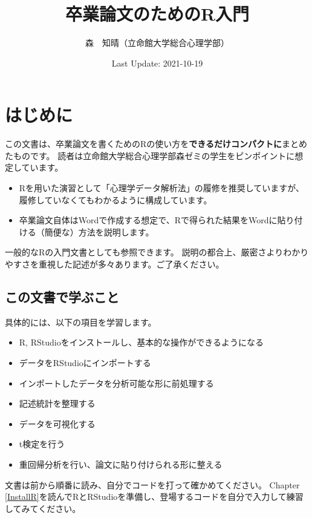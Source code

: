 \documentclass[
]{book}
\title{卒業論文のためのR入門}
\author{森　知晴（立命館大学総合心理学部）}
\date{Last Update: 2021-10-19}
\providecommand{\tightlist}{%
  \setlength{\itemsep}{0pt}\setlength{\parskip}{0pt}}
\begin{document}
\maketitle

{
\setcounter{tocdepth}{1}
\tableofcontents
}
\hypertarget{Introduction}{%
\chapter{はじめに}\label{Introduction}}

この文書は、卒業論文を書くためのRの使い方を\textbf{できるだけコンパクトに}まとめたものです。
読者は立命館大学総合心理学部森ゼミの学生をピンポイントに想定しています。

\begin{itemize}
\tightlist
\item
  Rを用いた演習として「心理学データ解析法」の履修を推奨していますが、履修していなくてもわかるように構成しています。
\item
  卒業論文自体はWordで作成する想定で、Rで得られた結果をWordに貼り付ける（簡便な）方法を説明します。
\end{itemize}

一般的なRの入門文書としても参照できます。
説明の都合上、厳密さよりわかりやすさを重視した記述が多々あります。ご了承ください。

\hypertarget{ux3053ux306eux6587ux66f8ux3067ux5b66ux3076ux3053ux3068}{%
\section{この文書で学ぶこと}\label{ux3053ux306eux6587ux66f8ux3067ux5b66ux3076ux3053ux3068}}

具体的には、以下の項目を学習します。

\begin{itemize}
\tightlist
\item
  R, RStudioをインストールし、基本的な操作ができるようになる
\item
  データをRStudioにインポートする
\item
  インポートしたデータを分析可能な形に前処理する
\item
  記述統計を整理する
\item
  データを可視化する
\item
  t検定を行う
\item
  重回帰分析を行い、論文に貼り付けられる形に整える
\end{itemize}

文書は前から順番に読み、自分でコードを打って確かめてください。
Chapter \ref{InstallR}を読んでRとRStudioを準備し、登場するコードを自分で入力して練習してみてください。
\end{document}
